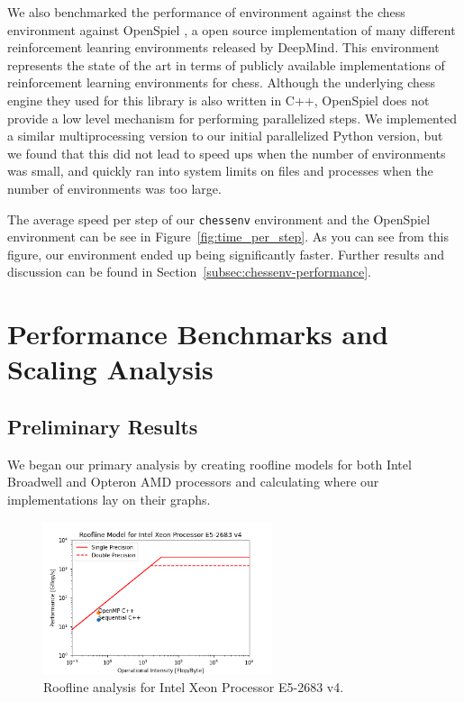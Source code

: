 \documentclass[12pt]{article}
\begin{document}
We also benchmarked the performance of environment against the chess environment against OpenSpiel \cite{OpenSpiel}, a open source implementation of many different reinforcement leanring environments released by DeepMind. This environment represents the state of the art in terms of publicly available implementations of reinforcement learning environments for chess. Although the underlying chess engine they used for this library is also written in C++, OpenSpiel does not provide a low level mechanism for performing parallelized steps. We implemented a similar multiprocessing version to our initial parallelized Python version, but we found that this did not lead to speed ups when the number of environments was small, and quickly ran into system limits on files and processes when the number of environments was too large. 

The average speed per step of our \texttt{chessenv} environment and the OpenSpiel environment can be see in Figure~\ref{fig:time_per_step}. As you can see from this figure, our environment ended up being significantly faster. Further results and discussion can be found in Section~\ref{subsec:chessenv-performance}.


\section{Performance Benchmarks and Scaling Analysis}\label{sec:benchmarks-and-analysis}

\subsection{Preliminary Results}\label{subsec:preliminary-results}

We began our primary analysis by creating roofline models for both Intel Broadwell and Opteron AMD processors and calculating where our implementations lay on their graphs.

\begin{figure}[H]
    \centering
    \includegraphics[width=0.6\textwidth]{plots/roofline_broadwell.png}
    \caption{Roofline analysis for Intel Xeon Processor E5-2683 v4.}
    \label{fig:roofline_broadwell}
\end{figure}
\end{document}
